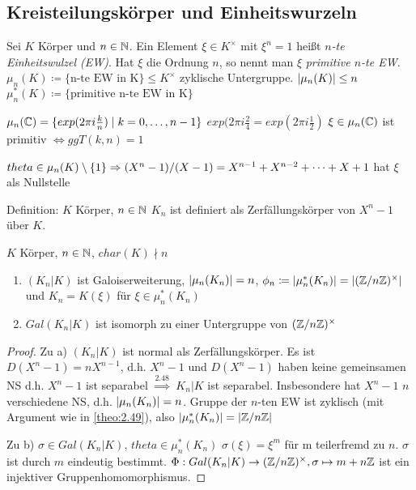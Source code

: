 \documentclass[../main.tex]{subfiles}
\begin{document}
\subsection{Kreisteilungskörper und Einheitswurzeln}
\begin{definition}
    Sei $K$ Körper und $n\in \mathbb{N}$.
    Ein Element $\xi\in K^\times$ mit $\xi^n=1$ heißt \emph{$n$-te Einheitswulzel (EW)}. Hat $\xi$ die Ordnung $n$, so nennt man $\xi$ \emph{primitive $n$-te EW}.
    $\mu_n(K)\coloneqq\{\text{n-te EW in K}\}\leq K^\times$ zyklische Untergruppe.
    $\left\vert \mu_n(K) \right\vert\leq n$
    $\mu_n^*(K) \coloneqq \{\text{primitive n-te EW in K}\}$
\end{definition}
\begin{example*}
    $\mu_n(\mathbb{C}) = \{exp(2\pi i\frac{k}{n})\mid k=0,\dots,n-1\}$
    $exp(2\pi i \frac{2}{4} = exp(2\pi i \frac{1}{2})$
    $\xi\in \mu_n(\mathbb{C})$ ist primitiv $\Leftrightarrow ggT(k,n)=1$

    $theta\in \mu_n(K)\setminus\{1\} \Rightarrow (X^n-1)/(X-1) = X^{n-1}+X^{n-2}+\dots+X+1$ hat $\xi$ als Nullstelle
    \TODO[bild]
\end{example*}
Definition:
$K$ Körper, $n\in \mathbb{N}$
$K_n$ ist definiert als Zerfällungskörper von $X^n-1$ über $K$.
\begin{theorem}\label{theo:3.10}
    $K$ Körper, $n\in \mathbb{N}$, $char(K)\nmid n$
    \begin{enumerate}[label=\alph*)]
        \item $(K_n|K)$ ist Galoiserweiterung, $\left\vert \mu_n(K_n) \right\vert=n$, $\phi_n\coloneqq \left\vert \mu_n^*(K_n) \right\vert= \left\vert (\mathbb{Z}/n\mathbb{Z})^\times \right\vert$ und
        $K_n = K(\xi)$ für $\xi \in \mu_n^*(K_n)$
        \item $Gal(K_n|K)$ ist isomorph zu einer Untergruppe von $(\mathbb{Z}/n\mathbb{Z})^\times$
    \end{enumerate}
\end{theorem}
\begin{proof}
    Zu a)
    $(K_n|K)$ ist normal als Zerfällungskörper.
    Es ist $D(X^n-1) = nX^{n-1}$, d.h. $X^n-1$ und $D(X^n-1)$ haben keine gemeinsamen NS d.h. $X^n-1$ ist separabel $\overset{2.48}{\Rightarrow}$ $K_n|K$ ist separabel.
    Insbesondere hat $X^n-1$ $n$ verschiedene NS, d.h. $\left\vert \mu_n(K_n) \right\vert = n$.
    Gruppe der $n$-ten EW ist zyklisch (mit Argument wie in \ref{theo:2.49}), also $\left\vert \mu_n^*(K_n) \right\vert = \left\vert \mathbb{Z}/n\mathbb{Z} \right\vert$

    Zu b)
    $\sigma \in Gal(K_n|K)$, $theta \in \mu_n^*(K_n)$
    $\sigma(\xi) = \xi^m$ für m teilerfremd zu $n$.
    $\sigma$ ist durch $m$ eindeutig bestimmt.
    $\Phi: Gal(K_n|K) \rightarrow (\mathbb{Z}/n\mathbb{Z})^\times, \sigma \mapsto m+n\mathbb{Z}$ ist ein injektiver Gruppenhomomorphismus.
\end{proof}
\end{document}
